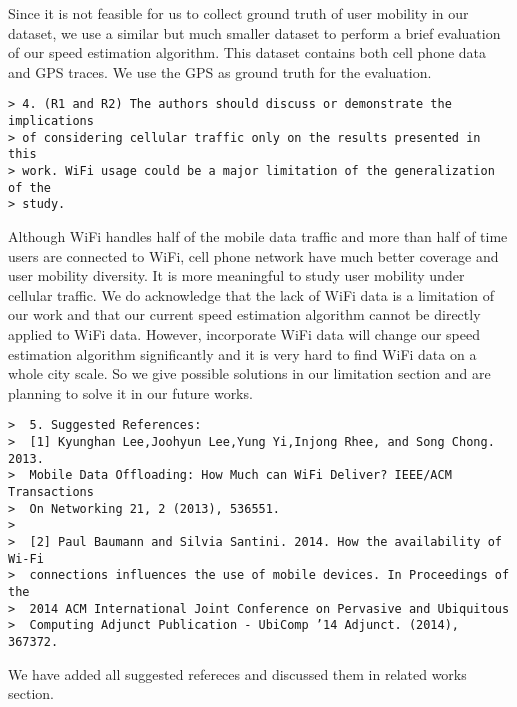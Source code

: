 Since it is not feasible for us to collect ground truth of user mobility in our dataset, we use a similar but much smaller dataset to perform a brief evaluation of our speed estimation algorithm. This dataset contains both cell phone data and GPS traces. We use the GPS as ground truth for the evaluation. %


\begin{verbatim}
> 4. (R1 and R2) The authors should discuss or demonstrate the implications
> of considering cellular traffic only on the results presented in this
> work. WiFi usage could be a major limitation of the generalization of the
> study.
\end{verbatim}

Although WiFi handles half of the mobile data traffic and more than half of time users are connected to WiFi, cell phone network have much better coverage and user mobility diversity. It is more meaningful to study user mobility under cellular traffic. We do acknowledge that the lack of WiFi data is a limitation of our work and that our current speed estimation algorithm cannot be directly applied to WiFi data. However, incorporate WiFi data will change our speed estimation algorithm significantly and it is very hard to find WiFi data on a whole city scale. So we give possible solutions in our limitation section and are planning to solve it in our future works.


\begin{verbatim}
>  5. Suggested References:
>  [1] Kyunghan Lee,Joohyun Lee,Yung Yi,Injong Rhee, and Song Chong. 2013.
>  Mobile Data Offloading: How Much can WiFi Deliver? IEEE/ACM Transactions
>  On Networking 21, 2 (2013), 536551.
>
>  [2] Paul Baumann and Silvia Santini. 2014. How the availability of Wi-Fi
>  connections influences the use of mobile devices. In Proceedings of the
>  2014 ACM International Joint Conference on Pervasive and Ubiquitous
>  Computing Adjunct Publication - UbiComp ’14 Adjunct. (2014), 367372.
\end{verbatim}

We have added all suggested refereces and discussed them in related works section.

